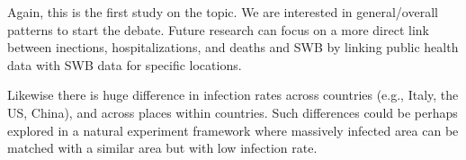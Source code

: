 \documentclass[10pt, letterpaper]{article}
\begin{document}
\begin{spacing}{1.4}
Again, this is the first study on the topic. We are interested in
general/overall patterns to start the debate. Future research can focus on a
more direct link between inections, hospitalizations, and deaths and SWB by
linking public health data with SWB data for specific locations.


Likewise there is huge difference in infection rates across countries (e.g.,
Italy, the US, China), and across places within countries. Such differences
could be perhaps explored in a natural experiment framework where massively
infected area can be matched with a similar area but with low infection rate.











\end{spacing}
\end{document}
